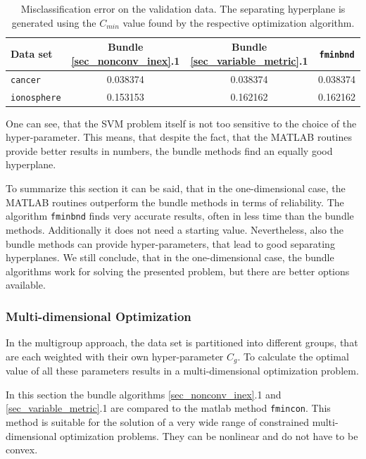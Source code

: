 \begin{table}%
\centering
\begin{tabular}{|l|c|c|c|}
	\hline
	Data set & Bundle \ref{sec_nonconv_inex}.1 & Bundle \ref{sec_variable_metric}.1 & \texttt{fminbnd}\\
	\hline
	\texttt{cancer} & 0.038374 & 0.038374 & 0.038374 \\
	\texttt{ionosphere} & 0.153153 & 0.162162 & 0.162162 \\
	\hline
\end{tabular}
\caption[Misclassification error for 1D data]{Misclassification error on the validation data. The separating hyperplane is generated using the \(C_{min}\) value found by the respective optimization algorithm.}
\label{misclass_1D}
\end{table}

One can see, that the SVM problem itself is not too sensitive to the choice of the hyper-parameter.
This means, that despite the fact, that the MATLAB routines provide better results in numbers, the bundle methods find an equally good hyperplane.

To summarize this section it can be said, that in the one-dimensional case, the MATLAB routines outperform the bundle methods in terms of reliability. The algorithm \texttt{fminbnd} finds very accurate results, often in less time than the bundle methods. Additionally it does not need a starting value.
Nevertheless, also the bundle methods can provide hyper-parameters, that lead to good separating hyperplanes.
We still conclude, that in the one-dimensional case, the bundle algorithms work for solving the presented problem, but there are better options available.

\subsubsection{Multi-dimensional Optimization}

In the multigroup approach, the data set is partitioned into different groups, that are each weighted with their own hyper-parameter \(C_g\).
To calculate the optimal value of all these parameters results in a multi-dimensional optimization problem.

In this section the bundle algorithms \ref{sec_nonconv_inex}.1 and \ref{sec_variable_metric}.1 are compared to the matlab method \texttt{fmincon}. This method is suitable for the solution of a very wide range of constrained multi-dimensional optimization problems. They can be nonlinear and do not have to be convex.

